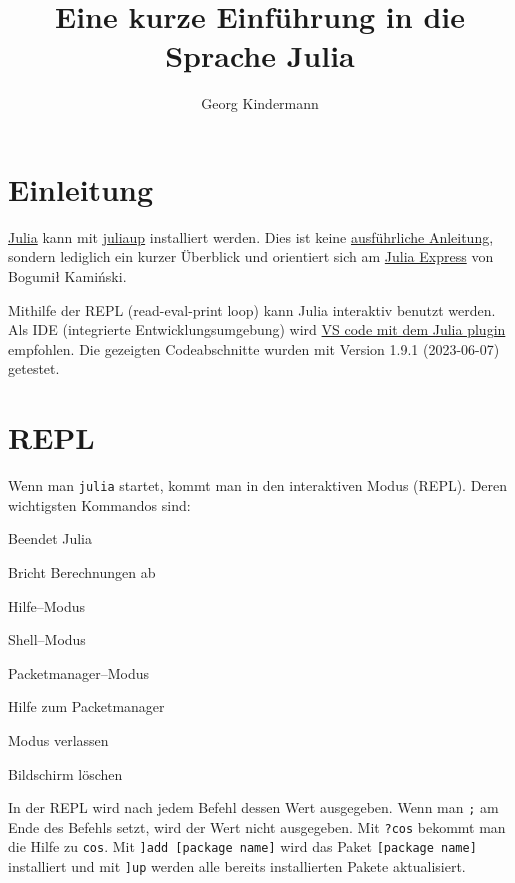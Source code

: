 \documentclass[10pt,twocolumn]{scrartcl}
\title{Eine kurze Einführung in die Sprache Julia}
\author{Georg Kindermann}
\begin{document}
\maketitle


\tableofcontents

\section{Einleitung}
\label{sec:einleitung}

\href{https://julialang.org/}{Julia} kann mit
\href{https://github.com/JuliaLang/juliaup}{juliaup} installiert werden. Dies
ist keine \href{https://docs.julialang.org/en/v1/}{ausführliche Anleitung},
sondern lediglich ein kurzer Überblick und orientiert sich am
\href{https://github.com/bkamins/The-Julia-Express}{Julia Express} von Bogumił Kamiński.

Mithilfe der REPL (read-eval-print loop) kann Julia interaktiv benutzt werden.
Als IDE (integrierte Entwicklungsumgebung) wird
\href{https://www.julia-vscode.org/}{VS code mit dem Julia plugin} empfohlen. Die gezeigten Codeabschnitte wurden mit Version 1.9.1 (2023-06-07) getestet.

\section{REPL}
\label{sec:repl}

Wenn man \lstinline|julia| startet, kommt man in den interaktiven Modus (REPL).
Deren wichtigsten Kommandos sind:
\begin{description}[style=multiline,leftmargin=2cm,nolistsep]
  \item[CTRL+d] Beendet Julia
  \item[CTRL+c] Bricht Berechnungen ab
  \item[?] Hilfe--Modus
  \item[;] Shell--Modus
  \item[{]}] Packetmanager--Modus
  \item[{]?}] Hilfe zum Packetmanager
  \item[Backspace] Modus verlassen
  \item[CTRL+l] Bildschirm löschen
\end{description}
In der REPL wird nach jedem Befehl dessen Wert ausgegeben. Wenn man
\lstinline|;| am Ende des Befehls setzt, wird der Wert nicht ausgegeben. Mit
\lstinline|?cos| bekommt man die Hilfe zu \lstinline|cos|. Mit
\lstinline|]add [package name]| wird das Paket
\lstinline|[package name]| installiert und mit
\lstinline|]up| werden alle bereits installierten Pakete aktualisiert.
\end{document}

